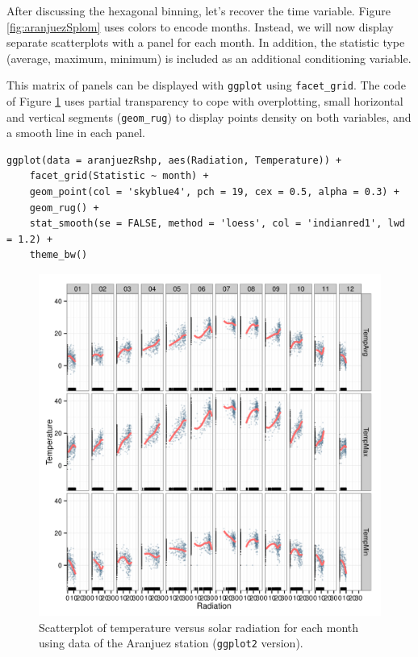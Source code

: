 \documentclass[smallroyalvopaper]{memoir}
\begin{document}
After discussing the hexagonal binning, let's recover the time
variable. Figure \ref{fig:aranjuezSplom} uses colors to encode
months. Instead, we will now display separate scatterplots with a
panel for each month. In addition, the statistic type (average,
maximum, minimum) is included as an additional conditioning variable.

This matrix of panels can be displayed with \texttt{ggplot} using
\texttt{facet\_grid}. The code of Figure \ref{fig:aranjuezFacetGrid} uses partial
transparency to cope with overplotting, small horizontal and vertical
segments (\texttt{geom\_rug}) to display points density on both variables, and
a smooth line in each panel.
\lstset{language=r,label= ,caption= ,captionpos=b,numbers=none}
\begin{lstlisting}
ggplot(data = aranjuezRshp, aes(Radiation, Temperature)) +
    facet_grid(Statistic ~ month) +
    geom_point(col = 'skyblue4', pch = 19, cex = 0.5, alpha = 0.3) +
    geom_rug() +
    stat_smooth(se = FALSE, method = 'loess', col = 'indianred1', lwd = 1.2) +
    theme_bw()
\end{lstlisting}

\begin{figure}[htbp]
\centering
\includegraphics[width=.9\linewidth]{figs/aranjuezFacetGrid.png}
\caption{Scatterplot of temperature versus solar radiation for each month using data of the Aranjuez station (\texttt{ggplot2} version). \label{fig:aranjuezFacetGrid}}
\end{figure}
\end{document}
